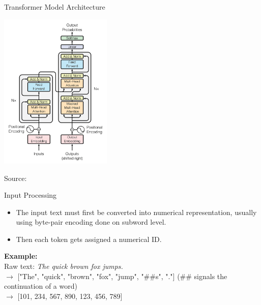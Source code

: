\documentclass{beamer}
\begin{document}
\begin{frame}{Transformer Model Architecture}
    \begin{center}
        \includegraphics[width=0.4\textwidth]{transformer_model.png}
        \par
        \small Source:  \cite{vaswani2017attention}
    \end{center}
    
\end{frame}

\begin{frame}{Input Processing}
\begin{itemize}
    \item The input text must first be converted into numerical representation, usually using byte-pair encoding done on subword level.
    \item Then each token gets assigned a numerical ID.
\end{itemize}

\textbf{Example:} \\
\vspace{1em}
Raw text: \textit{The quick brown fox jumps.} \\
$\rightarrow$ ["The", "quick", "brown", "fox", "jump", "\#\#s", "."] (\#\# signals the continuation of a word) \\
$\rightarrow$ [101, 234, 567, 890, 123, 456, 789]
\end{frame}
\end{document}
